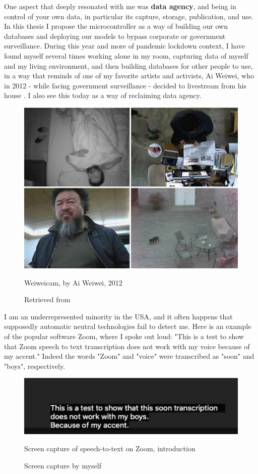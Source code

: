 One aspect that deeply resonated with me was \textbf{data agency}, and being in control of your own data, in particular its capture, storage, publication, and use. In this thesis I propose the microcontroller as a way of building our own databases and deploying our models to bypass corporate or government surveillance. During this year and more of pandemic lockdown context, I have found myself several times working alone in my room, capturing data of myself and my living environment, and then building databases for other people to use, in a way that reminds of one of my favorite artists and activists, Ai Weiwei, who in 2012 - while facing government surveillance - decided to livestream from his house \cite{website-forbes-ai-weiwei-cam}. I also see this today as a way of reclaiming data agency.

\begin{figure}[ht]
  \centering
  \includegraphics[width=0.75\linewidth,height=0.30\textheight,keepaspectratio]{images/weiweicam.jpg}
  \caption{Weiweicam, by Ai Weiwei, 2012}
  \caption*{Retrieved from \cite{website-forbes-ai-weiwei-cam}}
  \label{fig:weiweicam}
\end{figure}

I am an underrepresented minority in the USA, and it often happens that supposedly automatic neutral technologies fail to detect me. Here is an example of the popular software Zoom, where I spoke out loud: "This is a test to show that Zoom speech to text transcription does not work with my voice because of my accent." Indeed the words "Zoom" and "voice" were transcribed as "soon" and "boys", respectively.

\begin{figure}[ht]
  \centering
  \includegraphics[width=0.75\linewidth,height=0.25\textheight,keepaspectratio]{images/zoom-introduction.jpg}
  \caption{Screen capture of speech-to-text on Zoom, introduction}
  \caption*{Screen capture by myself}
  \label{fig:zoom-voice}
\end{figure}

